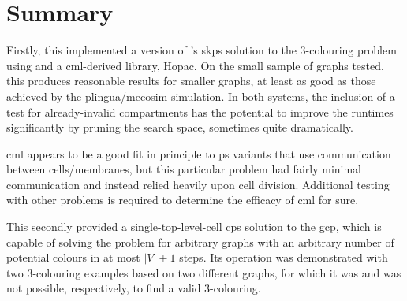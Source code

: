 




\section{\label{sec:gcol:conc}Summary}
Firstly, this  implemented a version of \citeauthor{Gheorghe2013}'s \gls{skps} solution to the 3-colouring problem using \fsharp{} and a \gls{cml}-derived library, Hopac.   On the small sample of graphs tested, this produces reasonable results for smaller graphs, at least as good as those achieved by the \gls{plingua}/\gls{mecosim} simulation.  In both systems, the inclusion of a test for already-invalid compartments has the potential to improve the runtimes significantly by pruning the search space, sometimes quite dramatically.

\Gls{cml} appears to be a good fit in principle to \gls{ps} variants that use communication between cells/membranes, but this particular problem had fairly minimal communication and instead relied heavily upon cell division.  Additional testing with other problems is required to determine the efficacy of \gls{cml} for sure.

This  secondly provided a single-top-level-cell \gls{cps} solution to the \gls{gcp}, which is capable of solving the problem for arbitrary graphs with an arbitrary number of potential colours in at most \(|V| + 1\) steps.  Its operation was demonstrated with two 3-colouring examples based on two different graphs, for which it was and was not possible, respectively, to find a valid 3-colouring.
